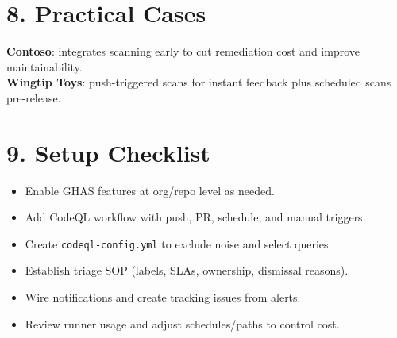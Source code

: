 \documentclass[11pt]{article}
\begin{document}
\section*{8. Practical Cases}
\textbf{Contoso}: integrates scanning early to cut remediation cost and improve maintainability.\\
\textbf{Wingtip Toys}: push-triggered scans for instant feedback plus scheduled scans pre-release.

\section*{9. Setup Checklist}
\begin{itemize}
  \item Enable GHAS features at org/repo level as needed.
  \item Add CodeQL workflow with push, PR, schedule, and manual triggers.
  \item Create \texttt{codeql-config.yml} to exclude noise and select queries.
  \item Establish triage SOP (labels, SLAs, ownership, dismissal reasons).
  \item Wire notifications and create tracking issues from alerts.
  \item Review runner usage and adjust schedules/paths to control cost.
\end{itemize}
\end{document}
